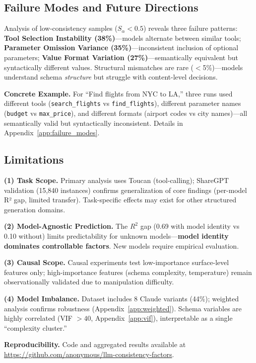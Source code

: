 \documentclass[sigconf,anonymous,review]{acmart}
\begin{document}
\subsection{Failure Modes and Future Directions}

Analysis of low-consistency samples ($S_\alpha < 0.5$) reveals three failure patterns: \textbf{Tool Selection Instability (38\%)}---models alternate between similar tools; \textbf{Parameter Omission Variance (35\%)}---inconsistent inclusion of optional parameters; \textbf{Value Format Variation (27\%)}---semantically equivalent but syntactically different values. Structural mismatches are rare ($<$5\%)---models understand schema \textit{structure} but struggle with content-level decisions.

\textbf{Concrete Example.} For ``Find flights from NYC to LA,'' three runs used different tools (\texttt{search\_flights} vs \texttt{find\_flights}), different parameter names (\texttt{budget} vs \texttt{max\_price}), and different formats (airport codes vs city names)---all semantically valid but syntactically inconsistent. Details in Appendix~\ref{app:failure_modes}.

\subsection{Limitations}

\textbf{(1) Task Scope.} Primary analysis uses Toucan (tool-calling); ShareGPT validation (15,840 instances) confirms generalization of core findings (per-model R² gap, limited transfer). Task-specific effects may exist for other structured generation domains.

\textbf{(2) Model-Agnostic Prediction.} The $R^2$ gap (0.69 with model identity vs 0.10 without) limits predictability for unknown models---\textbf{model identity dominates controllable factors}. New models require empirical evaluation.

\textbf{(3) Causal Scope.} Causal experiments test low-importance surface-level features only; high-importance features (schema complexity, temperature) remain observationally validated due to manipulation difficulty.

\textbf{(4) Model Imbalance.} Dataset includes 8 Claude variants (44\%); weighted analysis confirms robustness (Appendix~\ref{app:weighted}). Schema variables are highly correlated (VIF $>40$, Appendix~\ref{app:vif}), interpretable as a single ``complexity cluster.''

\textbf{Reproducibility.} Code and aggregated results available at \url{https://github.com/anonymous/llm-consistency-factors}.
\end{document}
